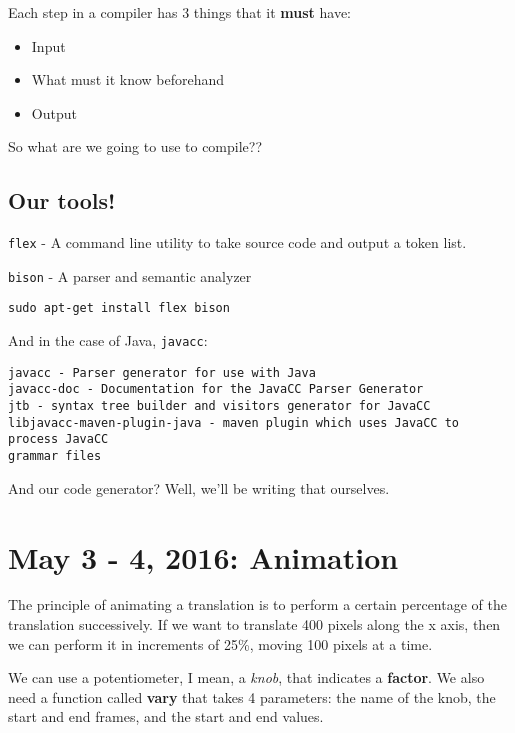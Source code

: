 \documentclass[11pt,fleqn]{article}
\theoremstyle{definition}
\begin{document}
Each step in a compiler has 3 things that it \textbf{must} have:
\begin{itemize}
    \item Input
    \item What must it know beforehand
    \item Output
\end{itemize}

So what are we going to use to compile??

\subsection{Our tools!}

\texttt{flex} - A command line utility to take source code and output a token
list.

\texttt{bison} - A parser and semantic analyzer

\texttt{sudo apt-get install flex bison}

And in the case of Java, \texttt{javacc}:

\begin{verbatim}
javacc - Parser generator for use with Java
javacc-doc - Documentation for the JavaCC Parser Generator
jtb - syntax tree builder and visitors generator for JavaCC
libjavacc-maven-plugin-java - maven plugin which uses JavaCC to process JavaCC
grammar files
\end{verbatim}

And our code generator? Well, we'll be writing that ourselves.

\newpage

\section{May 3 - 4, 2016: Animation}

The principle of animating a translation is to perform a certain percentage of the
translation successively. If we want to translate 400 pixels along the x axis, then
we can perform it in increments of 25\%, moving 100 pixels at a time.

We can use a potentiometer, I mean, a \textit{knob}, that indicates a
\textbf{factor}. We also need a function called \textbf{vary} that takes 4
parameters: the name of the knob, the start and end frames, and the start and end
values.
\end{document}
